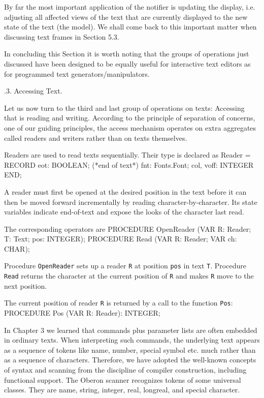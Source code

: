 By far the most important application of the notifier is updating the
display, i.e. adjusting all affected views of the text that are
currently displayed to the new state of the text (the model). We shall
come back to this important matter when discussing text frames in
Section 5.3.

In concluding this Section it is worth noting that the groups of
operations just discussed have been designed to be equally useful for
interactive text editors as for programmed text
generators/manipulators.

.3. Accessing Text.

Let us now turn to the third and last group of operations on texts:
Accessing that is reading and writing. According to the principle of
separation of concerns, one of our guiding principles, the access
mechanism operates on extra aggregates called readers and writers
rather than on texts themselves.

Readers are used to read texts sequentially. Their type is declared as
\begintt
Reader = RECORD
  eot: BOOLEAN; (*end of text*)
  fnt: Fonts.Font;
  col, voff: INTEGER
END;
\endtt

\noindent A reader must first be opened at the desired position in the text
before it can then be moved forward incrementally by reading
character-by-character. Its state variables indicate end-of-text and
expose the looks of the character last read.

The corresponding operators are
\begintt
PROCEDURE OpenReader (VAR R: Reader; T: Text; pos: INTEGER);
PROCEDURE Read (VAR R: Reader; VAR ch: CHAR);
\endtt

\noindent Procedure {\tt OpenReader\/} sets up a reader {\tt R\/} at position {\tt pos\/} in text
{\tt T\/}. Procedure {\tt Read\/} returns the character at the current position of {\tt R\/}
and makes {\tt R\/} move to the next position.

\noindent The current position of reader {\tt R\/} is returned by a call to the function {\tt Pos\/}:
\begintt
PROCEDURE Pos (VAR R: Reader): INTEGER;
\endtt

\noindent In Chapter 3 we learned that commands plus parameter lists are often
embedded in ordinary texts. When interpreting such commands, the
underlying text appears as a sequence of tokens like name, number,
special symbol etc. much rather than as a sequence of
characters. Therefore, we have adopted the well-known concepts of
syntax and scanning from the discipline of compiler construction,
including functional support. The Oberon scanner recognizes tokens of
some universal classes. They are name, string, integer, real,
longreal, and special character.

